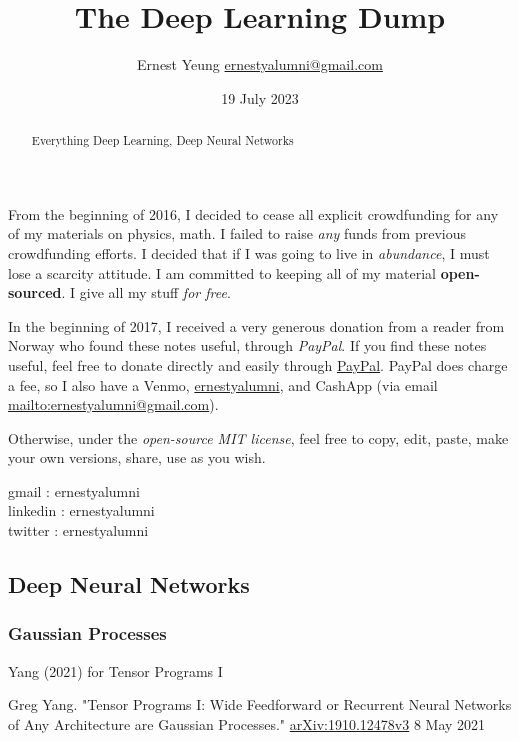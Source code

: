 \documentclass[10pt]{amsart}
\title{The Deep Learning Dump}
\author{Ernest Yeung \href{mailto:ernestyalumni@gmail.com}{ernestyalumni@gmail.com}}
\date{19 July 2023}
\begin{document}
	
	
\maketitle
	
From the beginning of 2016, I decided to cease all explicit crowdfunding for any of my materials on physics, math.  I failed to raise \emph{any} funds from previous crowdfunding efforts.  I decided that if I was going to live in \emph{abundance}, I must lose a scarcity attitude.  I am committed to keeping all of my material \textbf{open-sourced}.  I give all my stuff \emph{for free}.   
	
In the beginning of 2017, I received a very generous donation from a reader from Norway who found these notes useful, through \emph{PayPal}.  If you find these notes useful, feel free to donate directly and easily through \href{https://www.paypal.com/cgi-bin/webscr?cmd=_donations&business=ernestsaveschristmas%2bpaypal%40gmail%2ecom&lc=US&item_name=ernestyalumni&currency_code=USD&bn=PP%2dDonationsBF%3abtn_donateCC_LG%2egif%3aNonHosted}{PayPal}. PayPal does charge a fee, so I also have a Venmo, \href{https://account.venmo.com/u/ernestyalumni}{ernestyalumni}, and CashApp (via email \url{mailto:ernestyalumni@gmail.com}).

Otherwise, under the \emph{open-source MIT license}, feel free to copy, edit, paste, make your own versions, share, use as you wish.    

\noindent gmail        : ernestyalumni \\
linkedin     : ernestyalumni \\
twitter      : ernestyalumni \\

		
\begin{multicols*}{2}
		
\setcounter{tocdepth}{1}
\tableofcontents
		
\begin{abstract}
Everything Deep Learning, Deep Neural Networks
\end{abstract}
		
\part{Deep Neural Networks}

\section{Gaussian Processes}
Yang (2021) for Tensor Programs I\cite{Yang2021}



\end{multicols*}


\begin{thebibliography}{9}

Greg Yang. "Tensor Programs I: Wide Feedforward or Recurrent Neural Networks of Any Architecture are Gaussian Processes." \href{https://arxiv.org/pdf/1910.12478.pdf}{arXiv:1910.12478v3} 8 May 2021

\end{thebibliography}
\end{document}
